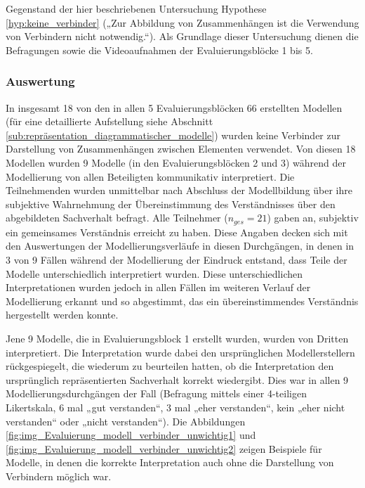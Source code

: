 Gegenstand der hier beschriebenen Untersuchung Hypothese \ref{hyp:keine_verbinder} („Zur Abbildung von Zusammenhängen ist die Verwendung von Verbindern nicht notwendig.“). Als Grundlage dieser Untersuchung dienen die Befragungen sowie die Videoaufnahmen der Evaluierungsblöcke 1 bis 5.

\subsubsection{Auswertung} %

In insgesamt 18 von den in allen 5 Evaluierungsblöcken 66 erstellten Modellen (für eine detaillierte Aufstellung siehe Abschnitt \ref{sub:repräsentation_diagrammatischer_modelle}) wurden keine Verbinder zur Darstellung von Zusammenhängen zwischen Elementen verwendet. Von diesen 18 Modellen wurden 9 Modelle (in den Evaluierungsblöcken 2 und 3) während der Modellierung von allen Beteiligten kommunikativ interpretiert. Die Teilnehmenden wurden unmittelbar nach Abschluss der Modellbildung über ihre subjektive Wahrnehmung der Übereinstimmung des Verständnisses über den abgebildeten Sachverhalt befragt. Alle Teilnehmer ($n_{ges}=21$) gaben an, subjektiv ein gemeinsames Verständnis erreicht zu haben. Diese Angaben decken sich mit den Auswertungen der Modellierungsverläufe in diesen Durchgängen, in denen in 3 von 9 Fällen während der Modellierung der Eindruck entstand, dass Teile der Modelle unterschiedlich interpretiert wurden. Diese unterschiedlichen Interpretationen wurden jedoch in allen Fällen im weiteren Verlauf der Modellierung erkannt und so abgestimmt, das ein übereinstimmendes Verständnis hergestellt werden konnte.

Jene 9 Modelle, die in Evaluierungsblock 1 erstellt wurden, wurden von Dritten interpretiert. Die Interpretation wurde dabei den ursprünglichen Modellerstellern rückgespiegelt, die wiederum zu beurteilen hatten, ob die Interpretation den ursprünglich repräsentierten Sachverhalt korrekt wiedergibt. Dies war in allen 9 Modellierungsdurchgängen der Fall (Befragung mittels einer 4-teiligen Likertskala, 6 mal „gut verstanden“, 3 mal „eher verstanden“, kein „eher nicht verstanden“ oder „nicht verstanden“). Die Abbildungen  \ref{fig:img_Evaluierung_modell_verbinder_unwichtig1} und \ref{fig:img_Evaluierung_modell_verbinder_unwichtig2} zeigen Beispiele für Modelle, in denen die korrekte Interpretation auch ohne die Darstellung von Verbindern möglich war.


